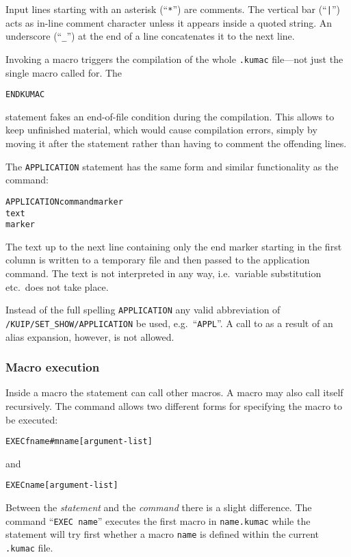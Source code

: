 Input lines starting with an asterisk (``\texttt{*}'') are comments.
The vertical bar (``\texttt{|}'') acts as in-line comment character unless
it appears inside a quoted string.
An underscore (``\verb!_!'') at the end of a line concatenates it to
the next line.

Invoking a macro triggers the compilation of the whole \texttt{.kumac}
file---not just the single macro called for.
The
\begin{alltt}
ENDKUMAC
\end{alltt}
statement fakes an end-of-file condition during the compilation.
This allows to keep unfinished material, which would cause compilation
errors, simply by moving it after the  statement rather
than having to comment the offending lines.

The \texttt{APPLICATION} statement has the same form and similar functionality
as the  command:
\begin{alltt}
APPLICATION  command  marker
   text
marker
\end{alltt}
The text up to the next line containing only the end marker starting
in the first column is written to a temporary file and then passed to
the application command.
The text is not interpreted in any way, i.e.\ variable substitution
etc.\ does not take place.

Instead of the full spelling \texttt{APPLICATION} any valid abbreviation
of \texttt{/KUIP/SET\_SHOW/APPLICATION} be used, e.g.\ ``\texttt{APPL}''.
A call to  as a result of an alias expansion,
however, is not allowed.


\subsubsection{Macro execution}

Inside a macro the  statement can call other macros.
A macro may also call itself recursively.
The  command allows two different forms for specifying the
macro to be executed:
\begin{alltt}
EXEC  fname#mname  [ argument-list ]
\end{alltt}
and
\begin{alltt}
EXEC  name  [ argument-list ]
\end{alltt}

Between the  \emph{statement} and 
the  \emph{command} there is a slight difference.
The command ``\texttt{EXEC name}'' executes the first macro in
\texttt{name.kumac} while the  statement will try first
whether a macro \texttt{name} is defined within the current \texttt{.kumac} file.

